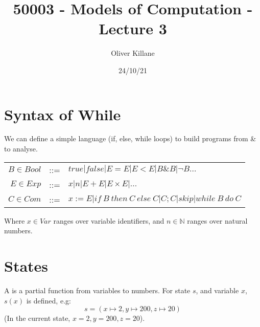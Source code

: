 \documentclass{report}
\title{50003 - Models of Computation - Lecture 3}
\author{Oliver Killane}
\date{24/10/21}
\begin{document}
    \maketitle

    \section*{Syntax of While}
        We can define a simple  language (if, else, while loops) to build programs from \& to analyse.
        \begin{center}
            \begin{tabular}{r c l}
                $B \in Bool$ & ::= & $true | false | E = E | E < E | B \& B | \neg B \dots$ \\
                $E \in Exp$ & ::= & $x | n | E + E | E \times E | \dots$ \\
                $C \in Com$ & ::= & $x :=E | if \ B \ then \ C \ else \ C | C;C | skip | while \ B \ do \ C$ \\
            \end{tabular}
        \end{center}
        Where $x \in Var$ ranges over variable identifiers, and $n \in \mathbb{N}$ ranges over natural numbers.
    
    \section*{States}
        A  is a partial function from variables to numbers. For state $s$, and variable $x$, $s(x)$ is defined, e.g:
        \[s = (x \mapsto 2, y \mapsto 200, z \mapsto 20)\]
        (In the current state, $x = 2, y = 200, z = 20$).
\end{document}
